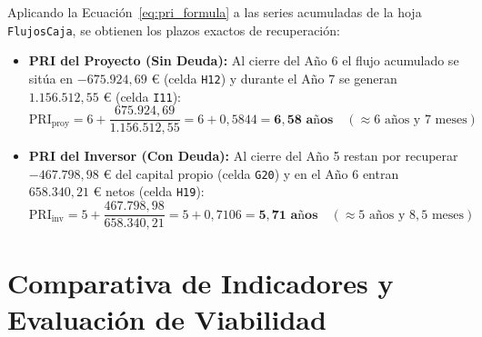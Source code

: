 \documentclass[a4paper,11pt]{report}
\providecommand{\euro}{€}
\begin{document}
Aplicando la Ecuación~\eqref{eq:pri_formula} a las series acumuladas de la hoja \texttt{FlujosCaja}, se obtienen los plazos exactos de recuperación:
\begin{itemize}
    \item \textbf{PRI del Proyecto (Sin Deuda):} Al cierre del Año 6 el flujo acumulado se sitúa en $-675.924,69\text{ \euro}$ (celda \texttt{H12}) y durante el Año 7 se generan $1.156.512,55\text{ \euro}$ (celda \texttt{I11}):
    \begin{equation}
        \text{PRI}_{\text{proy}} = 6 + \frac{675.924,69}{1.156.512,55} = 6 + 0,5844 = \mathbf{6,58\text{ años}} \quad (\approx 6\text{ años y } 7\text{ meses})
    \end{equation}
    \item \textbf{PRI del Inversor (Con Deuda):} Al cierre del Año 5 restan por recuperar $-467.798,98\text{ \euro}$ del capital propio (celda \texttt{G20}) y en el Año 6 entran $658.340,21\text{ \euro}$ netos (celda \texttt{H19}):
    \begin{equation}
        \text{PRI}_{\text{inv}} = 5 + \frac{467.798,98}{658.340,21} = 5 + 0,7106 = \mathbf{5,71\text{ años}} \quad (\approx 5\text{ años y } 8,5\text{ meses})
    \end{equation}
\end{itemize}

\section{Comparativa de Indicadores y Evaluación de Viabilidad}
\end{document}
